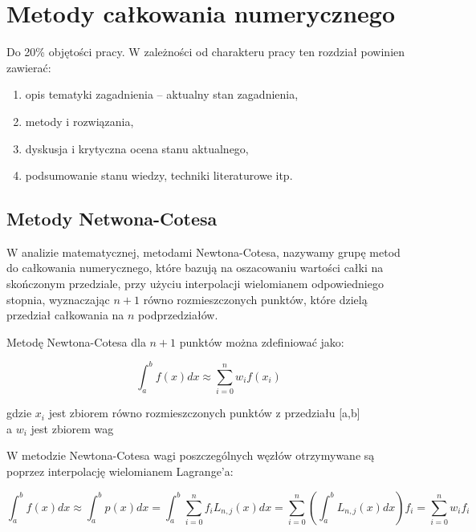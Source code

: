 \documentclass[12pt,twoside]{article}
\begin{document}
\clearpage

\section{Metody całkowania numerycznego}

Do 20\% objętości pracy. W zależności od charakteru pracy ten rozdział powinien zawierać:
\begin{enumerate}[label=\alph*), leftmargin=1.25cm]
	\item opis tematyki zagadnienia -- aktualny stan zagadnienia,
	\item metody i rozwiązania,
	\item dyskusja i krytyczna ocena stanu aktualnego,
	\item podsumowanie stanu wiedzy, techniki literaturowe itp.
\end{enumerate}


\subsection{Metody Netwona-Cotesa}

W analizie matematycznej, metodami Newtona-Cotesa, nazywamy grupę metod do całkowania numerycznego, które bazują na oszacowaniu wartości całki na skończonym przedziale, przy użyciu interpolacji wielomianem odpowiedniego stopnia, wyznaczając $n+1$ równo rozmieszczonych punktów, które dzielą przedział całkowania na $n$ podprzedziałów.
\cite{wikipedia}

Metodę Newtona-Cotesa dla $n+1$ punktów  można zdefiniować jako:

\begin{equation}
\int_a^b f(x)dx \approx \sum_{i=0}^n w_i f(x_i)
\label{Eq:rownanie}
\end{equation}


gdzie 
$x_i$ jest zbiorem równo rozmieszczonych punktów z przedziału [a,b]\\
a $w_i$ jest zbiorem wag


W metodzie Newtona-Cotesa wagi poszczególnych węzłów otrzymywane są poprzez interpolację wielomianem Lagrange'a:

\begin{equation}
\int_a^b f(x) dx \approx \int_a^b p(x) dx = \int_a^b \sum_{i=0}^{n} f_i L_{n,j}(x) dx = \sum_{i=0}^{n}(\int_a^b L_{n,j}(x)dx)f_i = \sum_{i=0}^{n} w_i f_i
\label{Eq:rownanie}
\end{equation}

\cite{web}
\end{document}
